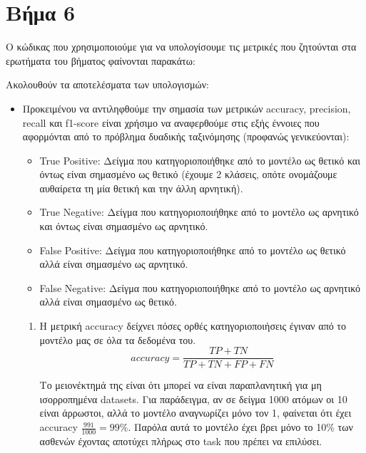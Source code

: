 \section*{Βήμα 6}

Ο κώδικας που χρησιμοποιούμε για να υπολογίσουμε τις μετρικές που ζητούνται στα ερωτήματα του βήματος φαίνονται παρακάτω:



\noindent Ακολουθούν τα αποτελέσματα των υπολογισμών:



\begin{itemize}
	\item Προκειμένου να αντιληφθούμε την σημασία των μετρικών accuracy, precision, recall και f1-score είναι χρήσιμο να αναφερθούμε στις εξής έννοιες που αφορμόνται από το πρόβλημα δυαδικής ταξινόμησης (προφανώς γενικεύονται):
	\begin{itemize}
		\item True Positive: Δείγμα που κατηγοριοποιήθηκε από το μοντέλο ως θετικό και όντως είναι σημασμένο ως θετικό (έχουμε 2 κλάσεις, οπότε ονομάζουμε αυθαίρετα τη μία θετική και την άλλη αρνητική).
		
		\item True Negative: Δείγμα που κατηγοριοποιήθηκε από το μοντέλο ως αρνητικό και όντως είναι σημασμένο ως αρνητικό.
		
		\item False Positive: Δείγμα που κατηγοριοποιήθηκε από το μοντέλο ως θετικό αλλά είναι σημασμένο ως αρνητικό.
		
		\item False Negative: Δείγμα που κατηγοριοποιήθηκε από το μοντέλο ως αρνητικό αλλά είναι σημασμένο ως θετικό.
	\end{itemize}
	
	\begin{enumerate}
		\item Η μετρική accuracy δείχνει πόσες ορθές κατηγοριοποιήσεις έγιναν από το μοντέλο μας σε όλα τα δεδομένα του.
		$$accuracy = \frac{TP+TN}{TP+TN+FP+FN}$$
		
		Το μειονέκτημά της είναι ότι μπορεί να είναι παραπλανητική για μη ισορροπημένα datasets. Για παράδειγμα, αν σε δείγμα 1000 ατόμων οι 10 είναι άρρωστοι, αλλά το μοντέλο αναγνωρίζει μόνο τον 1, φαίνεται ότι έχει accuracy $\frac{991}{1000} = 99\%$. Παρόλα αυτά το μοντέλο έχει βρει μόνο το 10\% των ασθενών έχοντας αποτύχει πλήρως στο task που πρέπει να επιλύσει.
		

\end{enumerate}
\end{itemize}
